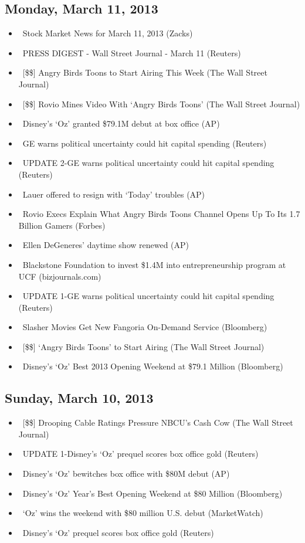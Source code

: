 \documentclass[11pt,asymmetric]{article}
\begin{document}
\subsection*{Monday, March 11, 2013}
\begin{itemize}
\item\ Stock Market News for March 11, 2013 (Zacks)
\item\ PRESS DIGEST - Wall Street Journal - March 11 (Reuters)
\item\ [\$\$] Angry Birds Toons to Start Airing This Week (The Wall Street Journal)
\item\ [\$\$] Rovio Mines Video With `Angry Birds Toons' (The Wall Street Journal)
\item\ Disney's `Oz' granted \$79.1M debut at box office (AP)
\item\ GE warns political uncertainty could hit capital spending (Reuters)
\item\ UPDATE 2-GE warns political uncertainty could hit capital spending (Reuters)
\item\ Lauer offered to resign with `Today' troubles (AP)
\item\ Rovio Execs Explain What Angry Birds Toons Channel Opens Up To Its 1.7 Billion Gamers (Forbes)
\item\ Ellen DeGeneres' daytime show renewed (AP)
\item\ Blackstone Foundation to invest \$1.4M into entrepreneurship program at UCF (bizjournals.com)
\item\ UPDATE 1-GE warns political uncertainty could hit capital spending (Reuters)
\item\ Slasher Movies Get New Fangoria On-Demand Service (Bloomberg)
\item\ [\$\$] `Angry Birds Toons' to Start Airing (The Wall Street Journal)
\item\ Disney’s ‘Oz’ Best 2013 Opening Weekend at \$79.1 Million (Bloomberg)
\end{itemize}
\subsection*{Sunday, March 10, 2013}
\begin{itemize}
\item\ [\$\$] Drooping Cable Ratings Pressure NBCU's Cash Cow (The Wall Street Journal)
\item\ UPDATE 1-Disney's `Oz' prequel scores box office gold (Reuters)
\item\ Disney's `Oz' bewitches box office with \$80M debut (AP)
\item\ Disney’s ‘Oz’ Year’s Best Opening Weekend at \$80 Million (Bloomberg)
\item\ ‘Oz’ wins the weekend with \$80 million U.S. debut (MarketWatch)
\item\ Disney's `Oz' prequel scores box office gold (Reuters)
\end{itemize}
\end{document}

